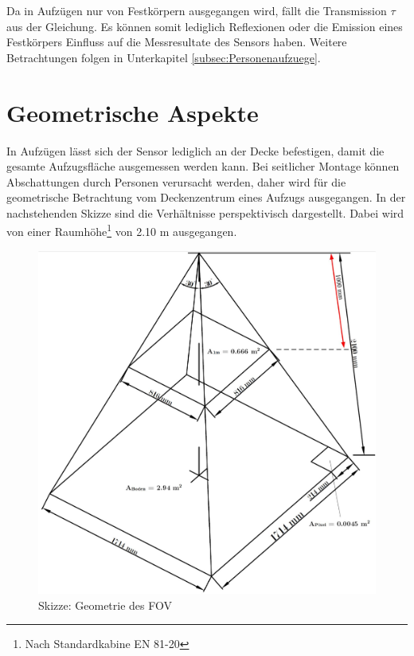 Da in Aufzügen nur von Festkörpern ausgegangen wird, fällt die Transmission $\tau$ aus der Gleichung. Es können somit lediglich Reflexionen oder die Emission eines Festkörpers Einfluss auf die Messresultate des Sensors haben. Weitere Betrachtungen folgen in Unterkapitel \ref{subsec:Personenaufzuege}.

\section{Geometrische Aspekte}
\label{sec:geometrie}

In Aufzügen lässt sich der Sensor lediglich an der Decke befestigen, damit die gesamte Aufzugsfläche ausgemessen werden kann. Bei seitlicher Montage können Abschattungen durch Personen verursacht werden, daher wird für die geometrische Betrachtung vom Deckenzentrum eines Aufzugs ausgegangen. In der nachstehenden Skizze sind die Verhältnisse perspektivisch dargestellt. Dabei wird von einer Raumhöhe\footnote[5]{Nach Standardkabine EN 81-20} von 2.10 m ausgegangen.
 
 
\begin{figure}[H]
	\centering
	\includegraphics[width=1.0\textwidth]{fig/Skizze_bearb.jpg}
	\caption[Skizze Geometrie des \ac{FOV}]{Skizze: Geometrie des \ac{FOV}}
	\label{fig:skizze}
\end{figure}

